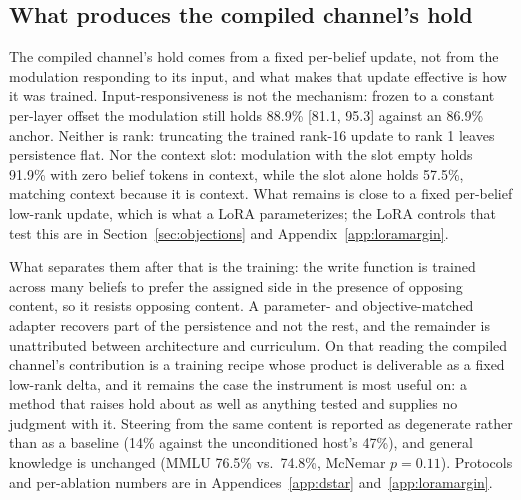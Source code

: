 \iflongversion
\subsection{What produces the compiled channel's hold}
\label{sec:isolation}
\label{sec:isolation-steering}\label{sec:isolation-frozen}%
\label{sec:isolation-lora}\label{sec:isolation-further}%
\label{sec:isolation-rank}\label{sec:isolation-amplitude}%
\label{sec:isolation-mmlu}

The compiled channel's hold comes from a fixed per-belief update, not from the modulation
responding to its input, and what makes that update effective is how it was trained.
Input-responsiveness is not the mechanism: frozen to a constant per-layer offset the modulation
still holds 88.9\% [81.1, 95.3] against an 86.9\% anchor. Neither is rank: truncating the
trained rank-16 update to rank 1 leaves persistence flat. Nor the context slot: modulation with
the slot empty holds 91.9\% with zero belief tokens in context, while the slot alone holds
57.5\%, matching context because it is context. What remains is close to a fixed per-belief
low-rank update, which is what a LoRA parameterizes; the LoRA controls that test this
are in Section~\ref{sec:objections} and Appendix~\ref{app:loramargin}.

What separates them after that is the training: the write function is trained across many
beliefs to prefer the assigned side in the presence of opposing content, so it resists opposing
content. A parameter- and objective-matched adapter recovers part of the persistence and not
the rest, and the remainder is unattributed between architecture and curriculum. On that reading the compiled channel's
contribution is a training recipe whose product is deliverable as a fixed low-rank delta, and
it remains the case the instrument is most useful on: a method that raises hold about as well
as anything tested and supplies no judgment with it. Steering from the same content is reported
as degenerate rather than as a baseline (14\% against the unconditioned host's 47\%), and
general knowledge is unchanged (MMLU 76.5\% vs.\ 74.8\%, McNemar \(p=0.11\)). Protocols and
per-ablation numbers are in Appendices~\ref{app:dstar} and~\ref{app:loramargin}.
\fi
